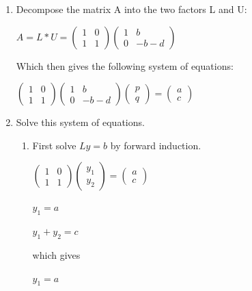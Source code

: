 \documentclass{article}
\begin{document}
\begin{enumerate}
\item Decompose the matrix A into the two factors L and U:
\begin{center} $ A= L*U=
 \begin{pmatrix}
  1 & 0 \\
  1 & 1
 \end{pmatrix}
  \begin{pmatrix}
  1 & b \\
  0 & -b-d
 \end{pmatrix} $ \end{center}
Which then gives the following system of equations:
\begin{center}$ \begin{pmatrix}
  1 & 0 \\
  1 & 1
 \end{pmatrix}
  \begin{pmatrix}
  1 & b \\
  0 & -b-d
 \end{pmatrix}
 \begin{pmatrix}
  p \\
  q 
 \end{pmatrix}
 =
  \begin{pmatrix}
  a \\
  c 
 \end{pmatrix}$\end{center}
\item Solve this system of equations.
\begin{enumerate}
\item First solve $Ly=b$ by forward induction.
 \begin{center} $\begin{pmatrix}
  1 & 0 \\
  1 & 1
 \end{pmatrix}
 \begin{pmatrix}
  y_1 \\
  y_2
 \end{pmatrix}
 =
  \begin{pmatrix}
  a \\
  c
 \end{pmatrix} $ \end{center}
 \begin{center} $  y_1=a$  \end{center}
 \begin{center} $y_1+y_2=c $ \end{center}
which gives
 \begin{center} $  y_1=a$  \end{center}

\end{enumerate}
\end{enumerate}
\end{document}
